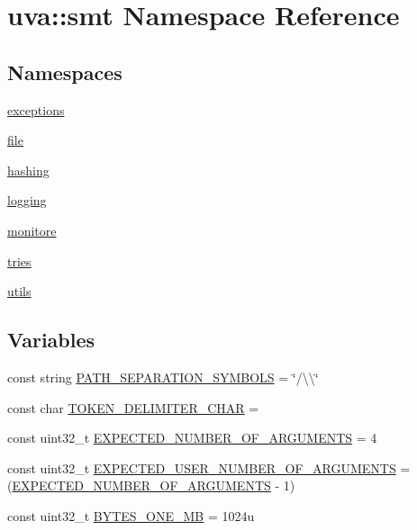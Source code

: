 \hypertarget{namespaceuva_1_1smt}{}\section{uva\+:\+:smt Namespace Reference}
\label{namespaceuva_1_1smt}
\subsection*{Namespaces}
\begin{DoxyCompactItemize}
\item 
 \hyperlink{namespaceuva_1_1smt_1_1exceptions}{exceptions}
\item 
 \hyperlink{namespaceuva_1_1smt_1_1file}{file}
\item 
 \hyperlink{namespaceuva_1_1smt_1_1hashing}{hashing}
\item 
 \hyperlink{namespaceuva_1_1smt_1_1logging}{logging}
\item 
 \hyperlink{namespaceuva_1_1smt_1_1monitore}{monitore}
\item 
 \hyperlink{namespaceuva_1_1smt_1_1tries}{tries}
\item 
 \hyperlink{namespaceuva_1_1smt_1_1utils}{utils}
\end{DoxyCompactItemize}
\subsection*{Variables}
\begin{DoxyCompactItemize}
\item 
const string \hyperlink{namespaceuva_1_1smt_afb9a44bd9eb3ded951a6f0c41f07c108}{P\+A\+T\+H\+\_\+\+S\+E\+P\+A\+R\+A\+T\+I\+O\+N\+\_\+\+S\+Y\+M\+B\+O\+L\+S} = \char`\"{}/\textbackslash{}\textbackslash{}\char`\"{}
\item 
const char \hyperlink{namespaceuva_1_1smt_a83e439b9599a06adad4132cbfa40e4e3}{T\+O\+K\+E\+N\+\_\+\+D\+E\+L\+I\+M\+I\+T\+E\+R\+\_\+\+C\+H\+A\+R} = \textquotesingle{} \textquotesingle{}
\item 
const uint32\+\_\+t \hyperlink{namespaceuva_1_1smt_a9e39178722f2843c618b9147c32f391b}{E\+X\+P\+E\+C\+T\+E\+D\+\_\+\+N\+U\+M\+B\+E\+R\+\_\+\+O\+F\+\_\+\+A\+R\+G\+U\+M\+E\+N\+T\+S} = 4
\item 
const uint32\+\_\+t \hyperlink{namespaceuva_1_1smt_a290a86fa61cbe01b8f829f3162862b8f}{E\+X\+P\+E\+C\+T\+E\+D\+\_\+\+U\+S\+E\+R\+\_\+\+N\+U\+M\+B\+E\+R\+\_\+\+O\+F\+\_\+\+A\+R\+G\+U\+M\+E\+N\+T\+S} = (\hyperlink{namespaceuva_1_1smt_a9e39178722f2843c618b9147c32f391b}{E\+X\+P\+E\+C\+T\+E\+D\+\_\+\+N\+U\+M\+B\+E\+R\+\_\+\+O\+F\+\_\+\+A\+R\+G\+U\+M\+E\+N\+T\+S} -\/ 1)
\item 
const uint32\+\_\+t \hyperlink{namespaceuva_1_1smt_abbea307ef2994458d86cad741edfe464}{B\+Y\+T\+E\+S\+\_\+\+O\+N\+E\+\_\+\+M\+B} = 1024u
\end{DoxyCompactItemize}


